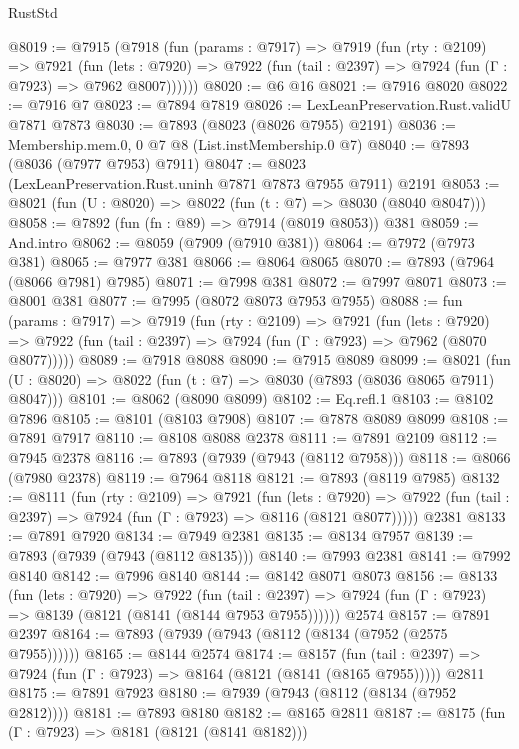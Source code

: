 \begin{lexlean}{RustStd}
\begin{coremodule}
{\begin{coremodule}
{{{{{{{{{{{{{{{{{{{{{{{{{{{{{{{{{{{{{{{{{{{{{{{{{{@8019 := @7915
    (@7918
      (fun (params : @7917) =>
      @7919
        (fun (rty : @2109) =>
        @7921
          (fun (lets : @7920) =>
          @7922 (fun (tail : @2397) => @7924 (fun (Γ : @7923) => @7962 @8007))))))
@8020 := @6 @16
@8021 := @7916 @8020
@8022 := @7916 @7
@8023 := @7894 @7819
@8026 := LexLeanPreservation.Rust.validU @7871 @7873
@8030 := @7893 (@8023 (@8026 @7955) @2191)
@8036 := Membership.mem.{0, 0} @7 @8 (List.instMembership.{0} @7)
@8040 := @7893 (@8036 (@7977 @7953) @7911)
@8047 := @8023 (LexLeanPreservation.Rust.uninh @7871 @7873 @7955 @7911) @2191
@8053 := @8021 (fun (U : @8020) => @8022 (fun (t : @7) => @8030 (@8040 @8047)))
@8058 := @7892 (fun (fn : @89) => @7914 (@8019 @8053)) @381
@8059 := And.intro
@8062 := @8059 (@7909 (@7910 @381))
@8064 := @7972 (@7973 @381)
@8065 := @7977 @381
@8066 := @8064 @8065
@8070 := @7893 (@7964 (@8066 @7981) @7985)
@8071 := @7998 @381
@8072 := @7997 @8071
@8073 := @8001 @381
@8077 := @7995 (@8072 @8073 @7953 @7955)
@8088 := fun (params : @7917) =>
  @7919
    (fun (rty : @2109) =>
    @7921
      (fun (lets : @7920) =>
      @7922 (fun (tail : @2397) => @7924 (fun (Γ : @7923) => @7962 (@8070 @8077)))))
@8089 := @7918 @8088
@8090 := @7915 @8089
@8099 := @8021 (fun (U : @8020) => @8022 (fun (t : @7) => @8030 (@7893 (@8036 @8065 @7911) @8047)))
@8101 := @8062 (@8090 @8099)
@8102 := Eq.refl.{1}
@8103 := @8102 @7896
@8105 := @8101 (@8103 @7908)
@8107 := @7878 @8089 @8099
@8108 := @7891 @7917
@8110 := @8108 @8088 @2378
@8111 := @7891 @2109
@8112 := @7945 @2378
@8116 := @7893 (@7939 (@7943 (@8112 @7958)))
@8118 := @8066 (@7980 @2378)
@8119 := @7964 @8118
@8121 := @7893 (@8119 @7985)
@8132 := @8111
    (fun (rty : @2109) =>
    @7921
      (fun (lets : @7920) =>
      @7922 (fun (tail : @2397) => @7924 (fun (Γ : @7923) => @8116 (@8121 @8077)))))
    @2381
@8133 := @7891 @7920
@8134 := @7949 @2381
@8135 := @8134 @7957
@8139 := @7893 (@7939 (@7943 (@8112 @8135)))
@8140 := @7993 @2381
@8141 := @7992 @8140
@8142 := @7996 @8140
@8144 := @8142 @8071 @8073
@8156 := @8133
    (fun (lets : @7920) =>
    @7922
      (fun (tail : @2397) => @7924 (fun (Γ : @7923) => @8139 (@8121 (@8141 (@8144 @7953 @7955))))))
    @2574
@8157 := @7891 @2397
@8164 := @7893 (@7939 (@7943 (@8112 (@8134 (@7952 (@2575 @7955))))))
@8165 := @8144 @2574
@8174 := @8157
    (fun (tail : @2397) => @7924 (fun (Γ : @7923) => @8164 (@8121 (@8141 (@8165 @7955)))))
    @2811
@8175 := @7891 @7923
@8180 := @7939 (@7943 (@8112 (@8134 (@7952 @2812))))
@8181 := @7893 @8180
@8182 := @8165 @2811
@8187 := @8175 (fun (Γ : @7923) => @8181 (@8121 (@8141 @8182)))
}}}}}}}}}}}}}}}}}}}}}}}}}}}}}}}}}}}}}}}}}}}}}}}}}}
\end{coremodule}}
\end{coremodule}
\end{lexlean}
